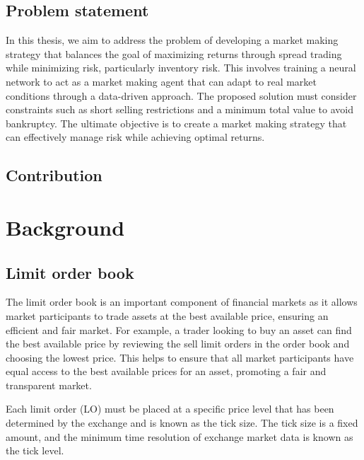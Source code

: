 \documentclass[
  12pt,
  a4paper,
  DIV=11,
  numbers=noendperiod]{scrartcl}
\begin{document}
\hypertarget{problem-statement}{%
\subsection{Problem statement}\label{problem-statement}}

In this thesis, we aim to address the problem of developing a market
making strategy that balances the goal of maximizing returns through
spread trading while minimizing risk, particularly inventory risk. This
involves training a neural network to act as a market making agent that
can adapt to real market conditions through a data-driven approach. The
proposed solution must consider constraints such as short selling
restrictions and a minimum total value to avoid bankruptcy. The ultimate
objective is to create a market making strategy that can effectively
manage risk while achieving optimal returns.

\hypertarget{contribution}{%
\subsection{Contribution}\label{contribution}}

\hypertarget{background}{%
\section{Background}\label{background}}

\hypertarget{limit-order-book}{%
\subsection{Limit order book}\label{limit-order-book}}

The limit order book is an important component of financial markets as
it allows market participants to trade assets at the best available
price, ensuring an efficient and fair market. For example, a trader
looking to buy an asset can find the best available price by reviewing
the sell limit orders in the order book and choosing the lowest price.
This helps to ensure that all market participants have equal access to
the best available prices for an asset, promoting a fair and transparent
market.

Each limit order (LO) must be placed at a specific price level that has
been determined by the exchange and is known as the tick size. The tick
size is a fixed amount, and the minimum time resolution of exchange
market data is known as the tick level.
\end{document}
